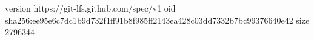version https://git-lfs.github.com/spec/v1
oid sha256:ee95e6c7dc1b9d732f1ff91b8f985ff2143ea428c03dd7332b7bc99376640e42
size 2796344
